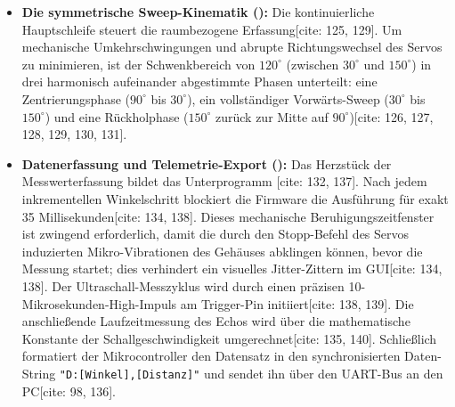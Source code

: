 \begin{itemize}
	\item \textbf{Die symmetrische Sweep-Kinematik ():} Die kontinuierliche Hauptschleife  steuert die raumbezogene Erfassung[cite: 125, 129]. Um mechanische Umkehrschwingungen und abrupte Richtungswechsel des Servos zu minimieren, ist der Schwenkbereich von $120^\circ$ (zwischen $30^\circ$ und $150^\circ$) in drei harmonisch aufeinander abgestimmte Phasen unterteilt: eine Zentrierungsphase ($90^\circ$ bis $30^\circ$), ein vollständiger Vorwärts-Sweep ($30^\circ$ bis $150^\circ$) und eine Rückholphase ($150^\circ$ zurück zur Mitte auf $90^\circ$)[cite: 126, 127, 128, 129, 130, 131].
	\item \textbf{Datenerfassung und Telemetrie-Export ():} Das Herzstück der Messwerterfassung bildet das Unterprogramm [cite: 132, 137]. Nach jedem inkrementellen Winkelschritt blockiert die Firmware die Ausführung für exakt 35 Millisekunden[cite: 134, 138]. Dieses mechanische Beruhigungszeitfenster ist zwingend erforderlich, damit die durch den Stopp-Befehl des Servos induzierten Mikro-Vibrationen des Gehäuses abklingen können, bevor die Messung startet; dies verhindert ein visuelles Jitter-Zittern im GUI[cite: 134, 138]. Der Ultraschall-Messzyklus wird durch einen präzisen 10-Mikrosekunden-High-Impuls am Trigger-Pin initiiert[cite: 138, 139]. Die anschließende Laufzeitmessung des Echos wird über die mathematische Konstante der Schallgeschwindigkeit umgerechnet[cite: 135, 140]. Schließlich formatiert der Mikrocontroller den Datensatz in den synchronisierten Daten-String \texttt{"D:[Winkel],[Distanz]"} und sendet ihn über den UART-Bus an den PC[cite: 98, 136].
\end{itemize}